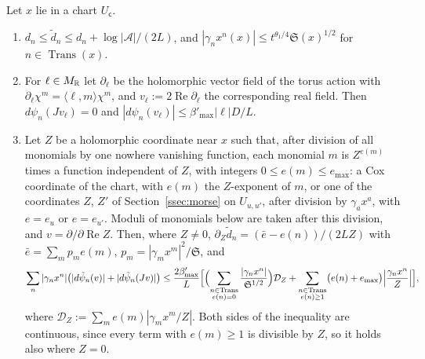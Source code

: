 \begin{lemma}\label{lem:refined}
Let $x$ lie in a chart $U_{\mathsf c}$.
\begin{enumerate}
\item $d_n\le\tilde d_n\le d_n+\log|\mathcal A|/(2L)$, and $|\gamma_nx^n(x)|\le t^{\theta_1/4}\mathfrak S(x)^{1/2}$ for
$n\in\operatorname{Trans}(x)$.
\item For $\ell\in M_\mathbb R$ let $\partial_\ell$ be the holomorphic vector field of the torus action with
$\partial_\ell\chi^m=\langle\ell,m\rangle\chi^m$, and $v_\ell:=2\operatorname{Re}\partial_\ell$ the corresponding real field.
Then $d\psi_n(Jv_\ell)=0$ and $|d\psi_n(v_\ell)|\le\beta'_{\max}|\ell|D/L$.
\item Let $Z$ be a holomorphic coordinate near $x$ such that, after division of all monomials by one nowhere vanishing
function, each monomial $m$ is $Z^{e(m)}$ times a function independent of $Z$, with integers $0\le e(m)\le e_{\max}$: a Cox
coordinate of the chart, with $e(m)$ the $Z$-exponent of $m$, or one of the coordinates $Z$, $Z'$ of
Section~\ref{ssec:morse} on $U_{u,u'}$, after division by $\gamma_ax^a$, with $e=e_u$ or $e=e_{u'}$. Moduli of monomials
below are taken after this division, and $v=\partial/\partial\operatorname{Re}Z$. Then, where $Z\ne0$,
$\partial_Z\tilde d_n=(\bar e-e(n))/(2LZ)$ with $\bar e=\sum_mp_me(m)$, $p_m=|\gamma_mx^m|^2/\mathfrak S$, and
\[
\sum_n|\gamma_nx^n|\bigl(|d\tilde\psi_n(v)|+|d\tilde\psi_n(Jv)|\bigr)\le\frac{2\beta'_{\max}}L\Bigl[\Bigl(\sum_{\substack{n\in\operatorname{Trans}\\
e(n)=0}}\frac{|\gamma_nx^n|}{\mathfrak S^{1/2}}\Bigr)\mathcal D_Z+\sum_{\substack{n\in\operatorname{Trans}\\ e(n)\ge1}}\bigl(e(n)+e_{\max}\bigr)
\Bigl|\frac{\gamma_nx^n}Z\Bigr|\Bigr],
\]
where $\mathcal D_Z:=\sum_me(m)|\gamma_mx^m/Z|$. Both sides of the inequality are continuous, since every term with
$e(m)\ge1$ is divisible by $Z$, so it holds also where $Z=0$.
\end{enumerate}
\end{lemma}

